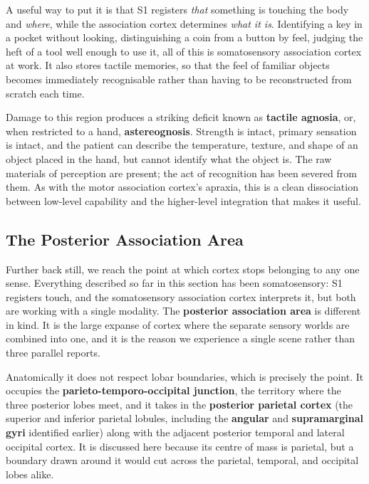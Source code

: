 \documentclass[11pt]{article}
\begin{document}
A useful way to put it is that S1 registers \textit{that} something is touching the body and \textit{where}, while the association cortex determines \textit{what it is}. Identifying a key in a pocket without looking, distinguishing a coin from a button by feel, judging the heft of a tool well enough to use it, all of this is somatosensory association cortex at work. It also stores tactile memories, so that the feel of familiar objects becomes immediately recognisable rather than having to be reconstructed from scratch each time.

Damage to this region produces a striking deficit known as \textbf{tactile agnosia}, or, when restricted to a hand, \textbf{astereognosis}. Strength is intact, primary sensation is intact, and the patient can describe the temperature, texture, and shape of an object placed in the hand, but cannot identify what the object is. The raw materials of perception are present; the act of recognition has been severed from them. As with the motor association cortex's apraxia, this is a clean dissociation between low-level capability and the higher-level integration that makes it useful.

\subsection{The Posterior Association Area}

Further back still, we reach the point at which cortex stops belonging to any one sense. Everything described so far in this section has been somatosensory: S1 registers touch, and the somatosensory association cortex interprets it, but both are working with a single modality. The \textbf{posterior association area} is different in kind. It is the large expanse of cortex where the separate sensory worlds are combined into one, and it is the reason we experience a single scene rather than three parallel reports.

Anatomically it does not respect lobar boundaries, which is precisely the point. It occupies the \textbf{parieto-temporo-occipital junction}, the territory where the three posterior lobes meet, and it takes in the \textbf{posterior parietal cortex} (the superior and inferior parietal lobules, including the \textbf{angular} and \textbf{supramarginal gyri} identified earlier) along with the adjacent posterior temporal and lateral occipital cortex. It is discussed here because its centre of mass is parietal, but a boundary drawn around it would cut across the parietal, temporal, and occipital lobes alike.
\end{document}
